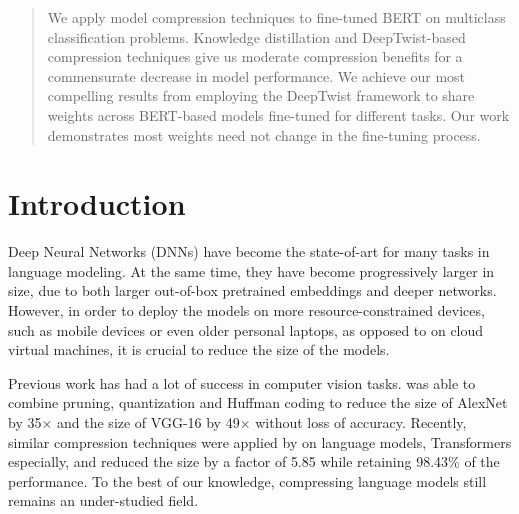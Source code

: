 \documentclass[10pt]{article}
\begin{document}

\begin{abstract}
  We apply model compression techniques to fine-tuned BERT on multiclass
  classification problems.  Knowledge distillation and DeepTwist-based
  compression techniques give us moderate compression benefits for a
  commensurate decrease in model performance. We achieve our most compelling
  results from employing the DeepTwist framework to share weights across
  BERT-based
  models fine-tuned for different tasks. Our work demonstrates most weights need
  not change in the fine-tuning process.%



\end{abstract}

\section{Introduction}
\label{sec:introduction}

Deep Neural Networks (DNNs) have become the state-of-art for many tasks in
language modeling. At the same time, they have become progressively larger in
size, due to both larger out-of-box pretrained embeddings and deeper
networks. However, in order to deploy the models on more resource-constrained
devices, such as mobile devices or even older personal laptops, as opposed to
on cloud virtual machines, it is crucial to reduce the size of the models.

Previous work has had a lot of success in computer vision tasks.
\citet{han2015deep} was able to combine pruning, quantization and Huffman
coding to reduce the size of AlexNet by 35$\times$ and the size of VGG-16 by
49$\times$ without loss of accuracy. Recently, similar compression techniques
were applied by \citet{cheong2014transformer} on language models, Transformers
especially, and reduced the size by a factor of 5.85 while retaining
98.43\%
of the performance. To the best of our knowledge, compressing language models
still remains an under-studied field.
\end{document}
